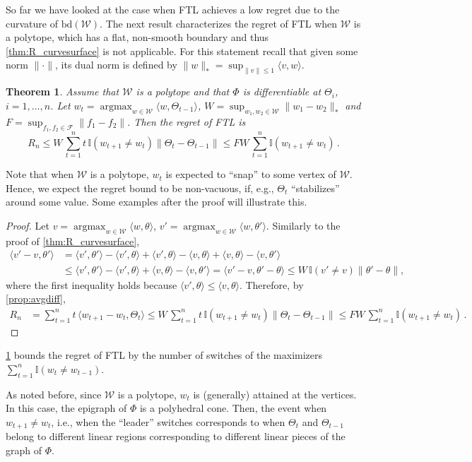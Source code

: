 \documentclass[english]{article}
\newcommand{\cW}{\mathcal{W}}
\newcommand{\cF}{\mathcal{F}}
\newcommand{\ind}{\mathbb{I}}
\newcommand{\inpro}[2]{\langle #1, #2\rangle}
\newcommand{\ip}[1]{\langle#1\rangle}
\newcommand{\norm}[1]{\left\| #1 \right\|}
\newcommand{\bd}{\mathrm{bd}}
\newcommand\numberthis{\addtocounter{equation}{1}\tag{\theequation}}
\DeclareMathOperator*{\argmax}{argmax}
\newtheorem{thm}{Theorem}[section]
\begin{document}
So far we have looked at the case when FTL achieves a low regret due to the curvature of $\bd(\cW)$.
The next result characterizes the regret of FTL when $\cW$ is a polytope, which has a flat, non-smooth boundary and thus \cref{thm:R_curvesurface} is not applicable. 
For this statement recall that given some norm $\|\cdot\|$,  its dual norm is defined by $\|w\|_* = \sup_{\|v\|\le 1} \inpro{v}{w}$.
\begin{thm}
	\label{thm:regretpolytope}
	Assume that $\cW$ is a polytope
	and that $\Phi$ is differentiable at $\Theta_i$, $i= 1, \ldots, n$. 
	Let $w_t = \argmax_{w\in\cW} \inpro{w}{\Theta_{t-1}}$,
	$W = \sup_{w_1,w_2\in\cW}\|w_1 - w_2\|_*$ and $F = \sup_{f_1,f_2\in \cF} \norm{f_1-f_2}$.
	 Then the regret of FTL is 
	\[
	R_n \le W\, \sum_{t=1}^{n} t \,\ind(w_{t+1}\neq w_{t})  \|\Theta_t - \Theta_{t-1}\| \le FW\,\sum_{t=1}^{n} \ind(w_{t+1}\neq w_{t})\,.
	\]
\end{thm}
Note that when $\cW$ is a polytope, $w_t$ is expected to ``snap'' to some vertex of $\cW$. Hence, 
we expect the regret bound to be non-vacuous, if, e.g., $\Theta_t$ ``stabilizes'' around some value. Some examples after the 
proof will illustrate this.
\begin{proof}
Let $v \!=\! \argmax_{w\in\cW} \inpro{w}{\theta}$, $v'\!=\!\argmax_{w\in \cW}\ip{w,\theta'}$. 
Similarly to the proof of \cref{thm:R_curvesurface},
	\begin{align*}
	\inpro{v'-v}{\theta'} & = \inpro{v'}{\theta'} - \inpro{v'}{\theta} + \inpro{v'}{\theta} - \inpro{v}{\theta} + \inpro{v}{\theta} -\inpro{v}{\theta'} \\
	& \le \inpro{v'}{\theta'} - \inpro{v'}{\theta} + \inpro{v}{\theta} -\inpro{v}{\theta'} %
	= \inpro{v' - v}{\theta' - \theta} 
	\le W\,\ind(v'\neq v)\|\theta' - \theta \|,
	\end{align*}
	where the first inequality %
	holds because $\inpro{v'}{\theta} \le \inpro{v}{\theta}$.
	Therefore, by \cref{prop:avgdiff}, 
	\begin{align*}
	R_n & = \sum_{t=1}^n t\,\ip{ w_{t+1}-w_t,\Theta_t} 
	 \le W\,\sum_{t=1}^{n} t\, \ind(w_{t+1}\!\neq\! w_{t})  \|\Theta_t - \Theta_{t-1}\| 
	 \le FW\,\sum_{t=1}^{n} \ind(w_{t+1}\!\neq\! w_{t})\,.
	\end{align*}
\end{proof}
\begin{comm}
	\cref{thm:regretpolytope} bounds the regret of FTL by the number of switches of the maximizers $\sum_{t=1}^{n} \ind(w_t\neq w_{t-1})$.
\end{comm}
\fi
As noted before,  since $\cW$ is a polytope, $w_t$ is (generally) attained at the vertices. 
In this case, the epigraph of $\Phi$  is a polyhedral cone. Then, the event when $w_{t+1}\neq w_{t}$, i.e., when 
	the ``leader'' switches corresponds to when 
	$\Theta_{t}$ and $\Theta_{t-1}$ belong to different linear regions corresponding to different linear pieces of the graph of $\Phi$.
\end{document}
